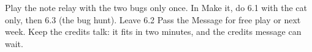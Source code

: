 \begin{teachernote}
Play the note relay with the two bugs only once. In Make it, do 6.1 with the cat only, then 6.3 (the bug hunt). Leave 6.2 Pass the Message for free play or next week. Keep the credits talk: it fits in two minutes, and the credits message can wait.
\end{teachernote}
